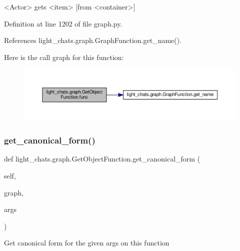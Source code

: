 \begin{DoxyVerb}<Actor> gets <item> [from <container>]\end{DoxyVerb}
 

Definition at line 1202 of file graph.\+py.



References light\+\_\+chats.\+graph.\+Graph\+Function.\+get\+\_\+name().

Here is the call graph for this function\+:
\nopagebreak
\begin{figure}[H]
\begin{center}
\leavevmode
\includegraphics[width=350pt]{classlight__chats_1_1graph_1_1GetObjectFunction_a36f3c298e8ac89d67ae856306d42a22d_cgraph}
\end{center}
\end{figure}
\mbox{\label{classlight__chats_1_1graph_1_1GetObjectFunction_a95528a5a8694228805bad940519e6e0e}} 
\subsubsection{\texorpdfstring{get\+\_\+canonical\+\_\+form()}{get\_canonical\_form()}}
{\footnotesize\ttfamily def light\+\_\+chats.\+graph.\+Get\+Object\+Function.\+get\+\_\+canonical\+\_\+form (\begin{DoxyParamCaption}\item[{}]{self,  }\item[{}]{graph,  }\item[{}]{args }\end{DoxyParamCaption})}

\begin{DoxyVerb}Get canonical form for the given args on this function\end{DoxyVerb}
 

